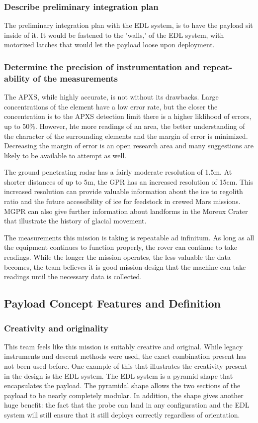 \documentclass[%
 portrait,
 aapm,
 mph,%
 amsmath,amssymb,
 reprint,%
]{revtex4-2}
\begin{document}
\subsubsection{Describe preliminary integration plan}
The preliminary integration plan with the EDL system, is to have the payload sit inside of it. It would be fastened to the 'walls,' of the EDL system, with motorized latches that would let the payload loose upon deployment. 

\subsubsection{ Determine the precision of instrumentation and repeat-ability of the
measurements}
The APXS, while highly accurate, is not without its drawbacks. Large concentrations of the element have a low error rate, but the closer the concentration is to the APXS detection limit there is a higher liklihood of errors, up to 50\%\cite{bruckner2003refined}. However, hte more readings of an area, the better understanding of the character of the surrounding elements and the margin of error is minimized. Decreasing the margin of error is an open research area and many suggestions are likely to be available to attempt as well. 

The ground penetrating radar has a fairly moderate resolution of 1.5m.  At shorter distances of up to 5m, the GPR has an increased resolution of 15cm. This increased resolution can provide valuable information about the ice to regolith ratio and the future accessibility of ice for feedstock in crewed Mars missions. MGPR can also give further information about landforms in the Moreux Crater that illustrate the history of glacial movement. 

The measurements this mission is taking is repeatable ad infinitum. As long as all the equipment continues to function properly, the rover can continue to take readings. While the longer the mission operates, the less valuable the data becomes, the team believes it is good mission design that the machine can take readings until the necessary data is collected. 

\subsection{Payload Concept Features and Definition}

\subsubsection{Creativity and originality}
This team feels like this mission is suitably creative and original. While legacy instruments and descent methods were used, the exact combination present has not been used before. One example of this that illustrates the creativity present in the design is the EDL system. The EDL system is a pyramid shape that encapsulates the payload. The pyramidal shape allows the two sections of the payload to be nearly completely modular. In addition, the shape gives another huge benefit: the fact that the probe can land in any configuration and the EDL system will still ensure that it still deploys correctly regardless of orientation. 
\end{document}
